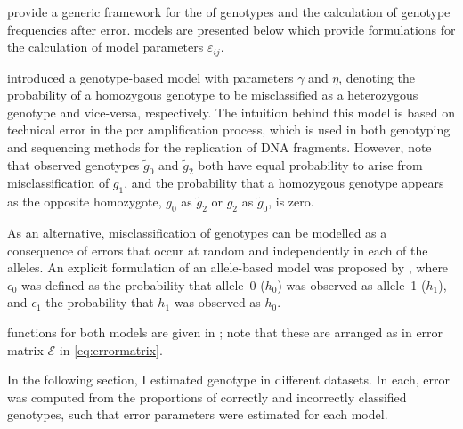  provide a generic framework for the  of genotypes and the calculation of genotype frequencies after error.
  models are presented below which provide formulations for the calculation of model parameters $\varepsilon_{ij}$.

\citet{Douglas:2002hp} introduced a genotype-based model with parameters $\gamma$ and $\eta$, denoting the probability of a homozygous genotype to be misclassified as a heterozygous genotype and vice-versa, respectively.
The intuition behind this model is based on technical error in the \gls{pcr} amplification process, which is used in both genotyping and sequencing methods for the replication of DNA fragments.
However, note that observed genotypes $\tilde{g}_0$ and $\tilde{g}_2$ both have equal probability to arise from misclassification of $g_1$, and the probability that a homozygous genotype appears as the opposite homozygote, $g_0$ as $\tilde{g}_2$ or $g_2$ as $\tilde{g}_0$, is zero.

As an alternative, misclassification of genotypes can be modelled as a consequence of errors that occur at random and independently in each of the  alleles.
An explicit formulation of an allele-based model was proposed by \citet{Gordon:2001im}, where $\epsilon_0$ was defined as the probability that allele~0 ($h_0$) was observed as allele~1 ($h_1$), and $\epsilon_1$ the probability that $h_1$ was observed as $h_0$.

%

%

%

%

 functions for both models are given in ; note that these are arranged as in error matrix $\mathcal{E}$ in \cref{eq:errormatrix}.

In the following section, I estimated genotype  in different datasets.
In each, error was computed from the proportions of correctly and incorrectly classified genotypes, such that error parameters were estimated for each model.






